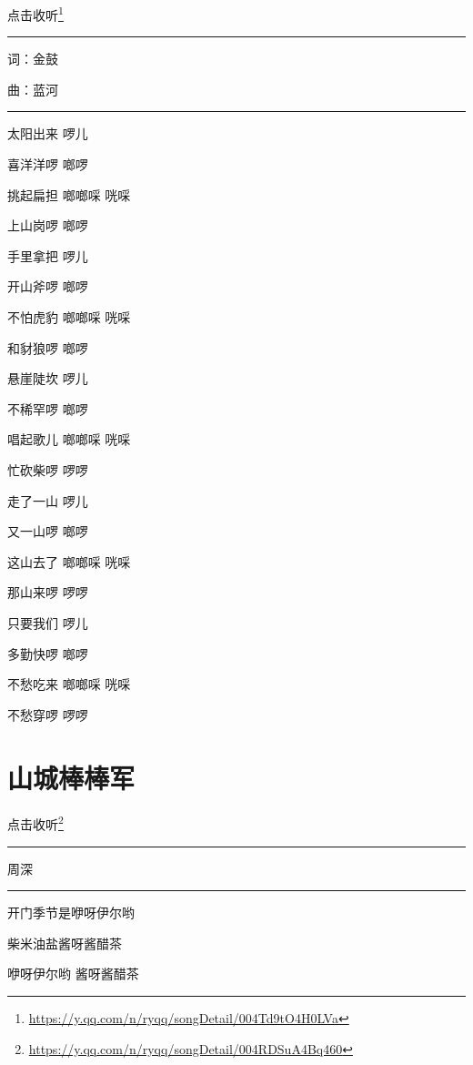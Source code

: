 \documentclass[]{ctexbook}
\renewcommand{\href}[2]{#2\footnote{\url{#1}}}
\begin{document}
\href{https://y.qq.com/n/ryqq/songDetail/004Td9tO4H0LVa}{点击收听}

\begin{center}\rule{0.5\linewidth}{0.5pt}\end{center}

词：金鼓

曲：蓝河

\begin{center}\rule{0.5\linewidth}{0.5pt}\end{center}

太阳出来 啰儿

喜洋洋啰 啷啰

挑起扁担 啷啷啋 咣啋

上山岗啰 啷啰

手里拿把 啰儿

开山斧啰 啷啰

不怕虎豹 啷啷啋 咣啋

和豺狼啰 啷啰

悬崖陡坎 啰儿

不稀罕啰 啷啰

唱起歌儿 啷啷啋 咣啋

忙砍柴啰 啰啰

走了一山 啰儿

又一山啰 啷啰

这山去了 啷啷啋 咣啋

那山来啰 啰啰

只要我们 啰儿

多勤快啰 啷啰

不愁吃来 啷啷啋 咣啋

不愁穿啰 啰啰

\section*{山城棒棒军}\label{nice-chongqing}


\href{https://y.qq.com/n/ryqq/songDetail/004RDSuA4Bq460}{点击收听}

\begin{center}\rule{0.5\linewidth}{0.5pt}\end{center}

周深

\begin{center}\rule{0.5\linewidth}{0.5pt}\end{center}

开门季节是咿呀伊尔哟

柴米油盐酱呀酱醋茶

咿呀伊尔哟 酱呀酱醋茶
\end{document}
